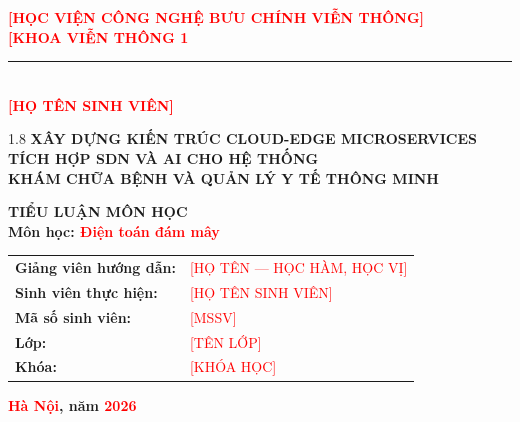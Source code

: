 \begin{titlepage}
\thispagestyle{empty}
\centering
\fontsize{14}{18}\selectfont

\textbf{\textcolor{red}{[HỌC VIỆN CÔNG NGHỆ BƯU CHÍNH VIỄN THÔNG]}}\\[0.2cm]
\textbf{\textcolor{red}{[KHOA VIỄN THÔNG 1}}\\[0.1cm]
\rule{0.6\textwidth}{0.4pt}\\[1.5cm]

{\fontsize{16}{20}\selectfont\bfseries \textcolor{red}{[HỌ TÊN SINH VIÊN]}}\\[2cm]

\begin{spacing}{1.8}
{\fontsize{17}{22}\selectfont\bfseries
XÂY DỰNG KIẾN TRÚC CLOUD-EDGE MICROSERVICES TÍCH HỢP SDN VÀ AI CHO HỆ THỐNG\\
KHÁM CHỮA BỆNH VÀ QUẢN LÝ Y TẾ THÔNG MINH
}
\end{spacing}

\vspace{0.8cm}
{\fontsize{14}{18}\selectfont\bfseries TIỂU LUẬN MÔN HỌC}\\[0.4cm]
{\bfseries Môn học: \textcolor{red}{Điện toán đám mây}}\\[0.2cm]

\begin{tabular}{ll}
\textbf{Giảng viên hướng dẫn:} & \textcolor{red}{[HỌ TÊN — HỌC HÀM, HỌC VỊ]} \\[0.4cm]
\textbf{Sinh viên thực hiện:}   & \textcolor{red}{[HỌ TÊN SINH VIÊN]}           \\[0.2cm]
\textbf{Mã số sinh viên:}       & \textcolor{red}{[MSSV]}                        \\[0.2cm]
\textbf{Lớp:}                   & \textcolor{red}{[TÊN LỚP]}                    \\[0.2cm]
\textbf{Khóa:}                  & \textcolor{red}{[KHÓA HỌC]}                   \\
\end{tabular}

\vfill
{\bfseries \textcolor{red}{Hà Nội}, năm \textcolor{red}{2026}}

\end{titlepage}
\newpage
